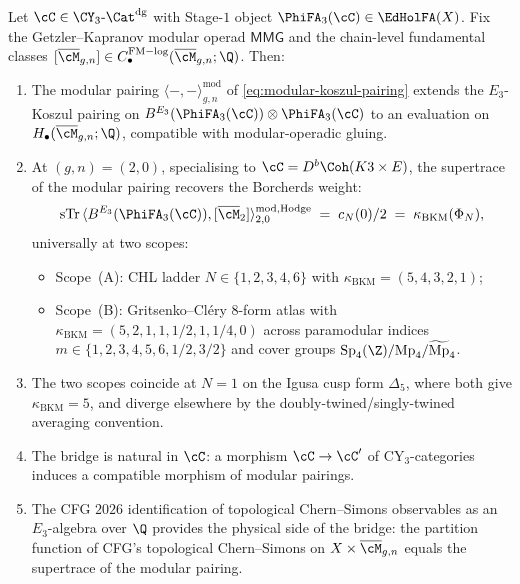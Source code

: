\begin{theorem}[Chain-level modular-Koszul bridge at $d = 3$]
\label{thm:modular-koszul-bridge-master-chain}
Let $\cC \in \CY_3\text{-}\Cat^{\mathrm{dg}}$ with Stage-$1$ object
$\PhiFA_3(\cC) \in \EdHolFA(X)$. Fix the Getzler--Kapranov modular
operad $\mathsf{MMG}$ and the chain-level fundamental classes
$[\overline{\cM}_{g, n}] \in C_\bullet^{\mathrm{FM-log}}(\overline{\cM}_{g, n}; \Q)$.
Then:
\begin{enumerate}[label=\textup{(\roman*)}]
\item The modular pairing
$\langle -, - \rangle^{\mathrm{mod}}_{g, n}$ of
\eqref{eq:modular-koszul-pairing} extends the $E_3$-Koszul pairing on
$B^{E_3}(\PhiFA_3(\cC)) \otimes \PhiFA_3(\cC)$ to an evaluation on
$H_\bullet(\overline{\cM}_{g, n}; \Q)$, compatible with modular-operadic
gluing.
\item At $(g, n) = (2, 0)$, specialising to $\cC = D^b\Coh(K3 \times E)$,
the supertrace of the modular pairing recovers the Borcherds weight:
\[
 \mathrm{sTr}\,\langle B^{E_3}(\PhiFA_3(\cC)),
 [\overline{\cM}_2]\rangle^{\mathrm{mod, Hodge}}_{2, 0}
 \;=\; c_N(0)/2 \;=\; \kappa_{\mathrm{BKM}}(\Phi_N),
\]
universally at two scopes:
\begin{itemize}
\item Scope~(A): CHL ladder $N \in \{1, 2, 3, 4, 6\}$ with
$\kappa_{\mathrm{BKM}} = (5, 4, 3, 2, 1)$;
\item Scope~(B): Gritsenko--Cl\'ery $8$-form atlas with
$\kappa_{\mathrm{BKM}} = (5, 2, 1, 1, 1/2, 1, 1/4, 0)$ across paramodular
indices $m \in \{1, 2, 3, 4, 5, 6, 1/2, 3/2\}$ and cover groups
$\mathrm{Sp}_4(\Z) / \mathrm{Mp}_4 / \widetilde{\mathrm{Mp}}_4$.
\end{itemize}
\item The two scopes coincide at $N = 1$ on the Igusa cusp form
$\Delta_5$, where both give $\kappa_{\mathrm{BKM}} = 5$, and diverge
elsewhere by the doubly-twined/singly-twined averaging convention.
\item The bridge is natural in $\cC$: a morphism $\cC \to \cC'$ of
CY$_3$-categories induces a compatible morphism of modular pairings.
\item The CFG $2026$ identification of topological Chern--Simons
observables as an $E_3$-algebra over $\Q$ provides the physical side of
the bridge: the partition function of CFG's topological Chern--Simons
on $X \times \overline{\cM}_{g, n}$ equals the supertrace of the modular
pairing.
\end{enumerate}
\end{theorem}

